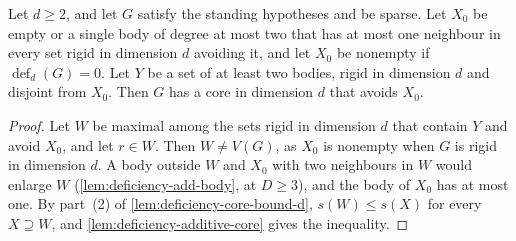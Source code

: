 \begin{lemma}
  \label{lem:pencil-d-maximal-rigid-core}
  \leanok
  Let $d \ge 2$, and let $G$ satisfy the standing hypotheses and be
  sparse. Let $X_0$ be empty or a single body of degree at most two that
  has at most one neighbour in every set rigid in dimension $d$ avoiding
  it, and let $X_0$ be nonempty if $\operatorname{def}_d(G) = 0$. Let
  $Y$ be a set of at least two bodies, rigid in dimension $d$ and
  disjoint from $X_0$. Then $G$ has a core in dimension $d$ that avoids
  $X_0$.
\end{lemma}
\begin{proof}
  \leanok
  Let $W$ be maximal among the sets rigid in dimension $d$ that contain
  $Y$ and avoid $X_0$, and let $r \in W$. Then $W \neq V(G)$, as $X_0$
  is nonempty when $G$ is rigid in dimension $d$. A body outside $W$ and
  $X_0$ with two neighbours in $W$ would enlarge $W$
  (\cref{lem:deficiency-add-body}, at $D \ge 3$), and the body of $X_0$
  has at most one. By part~(2) of \cref{lem:deficiency-core-bound-d},
  $s(W) \le s(X)$ for every $X \supseteq W$, and
  \cref{lem:deficiency-additive-core} gives the inequality.
\end{proof}

